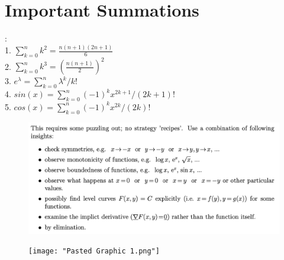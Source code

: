 \documentclass[twocolumn]{article}
\newcommand{\sectionspace}{\vspace*{1em}}
\begin{document}
\sectionspace


\section{Important Summations}
:\\
1. $\sum_{k=0}^{n} k^2 = \frac{n(n+1)(2n+1)}{6}$\\
2. $\sum_{k=0}^{n} k^3 = \left(\frac{n(n+1)}{2}\right)^2$\\
3. $e^\lambda = \sum_{k=0}^{n} \lambda^k/k!$\\
4. $sin(x) = \sum_{k=0}^{n} (-1)^k x^{2k+1}/(2k+1)!$\\
5. $cos(x) = \sum_{k=0}^{n} (-1)^k x^{2k}/(2k)!$

\sectionspace

\begin{figure}
	\centering
	\includegraphics[width=1\linewidth]{screenshot001}
	\caption{}
	\label{fig:screenshot001}
\end{figure}

\begin{figure}
	\centering
	\texttt{[image: "Pasted Graphic 1.png"]}
	\caption{}
	\label{fig:pasted-graphic-1}
\end{figure}
\end{document}
